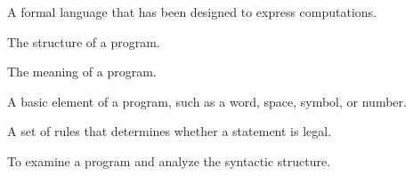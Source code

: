 \begin{description}
A formal language that has been designed to express computations.

The structure of a program.

The meaning of a program.

A basic element of a program, such as a word, space, symbol, or number.

A set of rules that determines whether a statement is legal.

To examine a program and analyze the syntactic structure.

\end{description}
